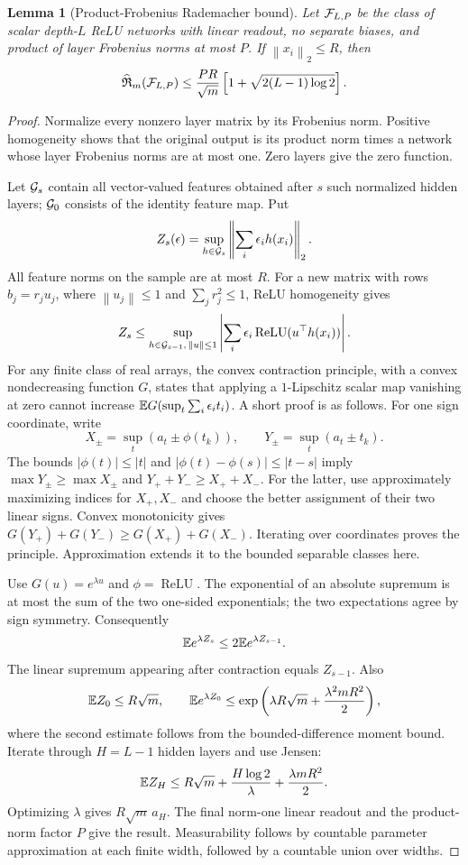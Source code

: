 \documentclass[11pt]{article}
\newtheorem{lemma}[theorem]{Lemma}
\theoremstyle{remark}\newtheorem{remark}[theorem]{Remark}
\newcommand{\relu}{\operatorname{ReLU}}
\newcommand{\norm}[1]{\left\lVert#1\right\rVert}
\begin{document}
\begin{lemma}[Product-Frobenius Rademacher bound]
\label{lem:rad}
Let $\mathcal F_{L,P}$ be the class of scalar depth-$L$ ReLU networks with linear readout, no separate biases, and product of layer Frobenius norms at most $P$. If $\norm{x_i}_2\le R$, then
\[
 \widehat{\mathfrak R}_m(\mathcal F_{L,P})\le\frac{PR}{\sqrt m}\left[1+\sqrt{2(L-1)\log2}\right].
\]
\end{lemma}
\begin{proof}
Normalize every nonzero layer matrix by its Frobenius norm. Positive homogeneity shows that the original output is its product norm times a network whose layer Frobenius norms are at most one. Zero layers give the zero function.

Let $\mathcal G_s$ contain all vector-valued features obtained after $s$ such normalized hidden layers; $\mathcal G_0$ consists of the identity feature map. Put
\[
 Z_s(\epsilon)=\sup_{h\in\cG_s}\norm{\sum_i\epsilon_i h(x_i)}_2.
\]
All feature norms on the sample are at most $R$. For a new matrix with rows $b_j=r_ju_j$, where $\norm{u_j}\le1$ and $\sum_jr_j^2\le1$, ReLU homogeneity gives
\[
 Z_s\le\sup_{h\in\cG_{s-1},\,\norm{u}\le1}
 \left|\sum_i\epsilon_i\relu(u^\top h(x_i))\right|.
\]
For any finite class of real arrays, the convex contraction principle, with a convex nondecreasing function $G$, states that applying a $1$-Lipschitz scalar map vanishing at zero cannot increase
$\mathbb E G(\sup_t\sum_i\epsilon_it_i)$. A short proof is as follows. For one sign coordinate, write
\[
 X_\pm=\sup_t(a_t\pm\phi(t_k)),\qquad
 Y_\pm=\sup_t(a_t\pm t_k).
\]
The bounds $|\phi(t)|\le|t|$ and $|\phi(t)-\phi(s)|\le|t-s|$ imply
$\max Y_\pm\ge\max X_\pm$ and $Y_++Y_-\ge X_++X_-$. For the latter, use approximately maximizing indices for $X_+,X_-$ and choose the better assignment of their two linear signs. Convex monotonicity gives
$G(Y_+)+G(Y_-)\ge G(X_+)+G(X_-)$. Iterating over coordinates proves the principle. Approximation extends it to the bounded separable classes here.

Use $G(u)=e^{\lambda u}$ and $\phi=\relu$. The exponential of an absolute supremum is at most the sum of the two one-sided exponentials; the two expectations agree by sign symmetry. Consequently
\[
 \mathbb E e^{\lambda Z_s}\le2\mathbb E e^{\lambda Z_{s-1}}.
\]
The linear supremum appearing after contraction equals $Z_{s-1}$. Also
\[
 \mathbb E Z_0\le R\sqrt m,
 \qquad
 \mathbb E e^{\lambda Z_0}\le\exp\left(\lambda R\sqrt m+\frac{\lambda^2mR^2}{2}\right),
\]
where the second estimate follows from the bounded-difference moment bound. Iterate through $H=L-1$ hidden layers and use Jensen:
\[
 \mathbb E Z_H\le R\sqrt m+\frac{H\log2}{\lambda}+\frac{\lambda mR^2}{2}.
\]
Optimizing $\lambda$ gives $R\sqrt m\,a_H$. The final norm-one linear readout and the product-norm factor $P$ give the result. Measurability follows by countable parameter approximation at each finite width, followed by a countable union over widths.
\end{proof}
\end{document}
